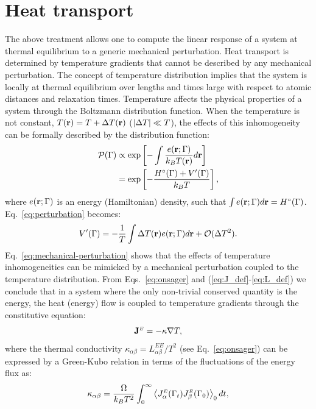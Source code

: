 \section{Heat transport}
The above treatment allows one to compute the linear response of a system at thermal equilibrium to a generic mechanical perturbation. Heat transport is determined by temperature gradients that cannot be described by any mechanical perturbation. The concept of temperature distribution implies that the system is locally at thermal equilibrium over lengths and times large with respect to atomic distances and relaxation times. Temperature affects the physical properties of a system through the Boltzmann distribution function. When the temperature is not constant, $T(\mathbf{r})=T+{\mathrm\Delta} T(\mathbf{r})$ ($|{\mathrm\Delta} T| \ll T$), the effects of this inhomogeneity can be formally described by the distribution function:
\begin{align}
  \mathcal{P}({\mathrm\Gamma}) & \propto
  \exp\left[ -\int \frac{e(\mathbf{r};{\mathrm\Gamma})}{k_BT(\mathbf{r})}d\mathbf{r} \right] \\
  &= \exp\left[ -\frac{H^\circ({\mathrm\Gamma})+V'({\mathrm\Gamma})}{k_BT} \right],
\end{align}
where $e(\mathbf{r};{\mathrm\Gamma})$ is an energy (Hamiltonian) density, such that $\int e(\mathbf{r};{\mathrm\Gamma}) d\mathbf{r} = H^\circ({\mathrm\Gamma})$. Eq.~\eqref{eq:perturbation} becomes:
\begin{equation}
   V'(\rGamma)=-\frac{1}{T}\int\rDelta T(\mathbf{r})e(\mathbf{r};\rGamma) d\mathbf{r} + \mathcal{O}(\rDelta T^2) . \label{eq:mechanical-perturbation}
\end{equation}
Eq.~\eqref{eq:mechanical-perturbation} shows that the effects of temperature inhomogeneities can be mimicked by a mechanical perturbation coupled to the temperature distribution. From Eqs.~\eqref{eq:onsager} and (\ref{eq:J_def}-\ref{eq:L_def}) we conclude that in a system where the only non-trivial conserved quantity is the energy, the heat (energy) flow is coupled to temperature gradients through the constitutive equation:
\begin{equation}
  \mathbf{J}^\smallE = - \kappa \nabla T, \label{eq:thermal-constitutive}
\end{equation}
where the thermal conductivity $\kappa_{\alpha\beta}= L^{\scriptscriptstyle EE}_{\alpha \beta} / T^2$ (see Eq.~\eqref{eq:onsager}) can be expressed by a Green-Kubo relation in terms of the fluctuations of the energy flux as:
\begin{equation}
  \kappa_{\alpha\beta} =\frac{\rOmega}{k_B T^2} \int_0^\infty \left \langle J^\smallE_\alpha(\rGamma_t) J^\smallE_\beta(\rGamma_0) \right \rangle_0 dt, \label{eq:GK-complete}
\end{equation}
